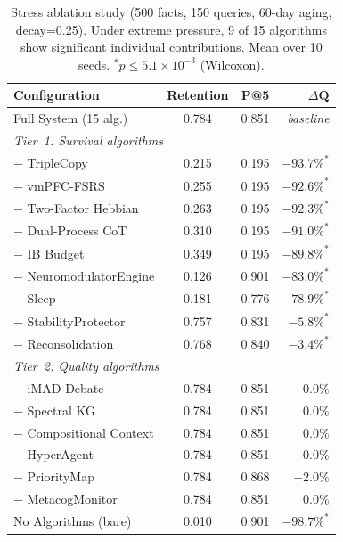 \documentclass{article}
\begin{document}
\begin{table}[h]
    \caption{Stress ablation study (500 facts, 150 queries,
    60-day aging, decay=0.25). Under extreme pressure, 9 of 15
    algorithms show significant individual contributions.
    Mean over 10 seeds. $^\ast p \le 5.1\times 10^{-3}$ (Wilcoxon).}
    \label{tab:stress-ablation}
    \centering
    \small
    \begin{tabular}{lccr}
        \toprule
        Configuration & Retention & P@5 & $\Delta$Q \\
        \midrule
        Full System (15 alg.) & 0.784 & 0.851 & \emph{baseline} \\
        \midrule
        \multicolumn{4}{l}{\textit{Tier~1: Survival algorithms}} \\
        $-$ TripleCopy & 0.215 & 0.195 & $-93.7\%^\ast$ \\
        $-$ vmPFC-FSRS & 0.255 & 0.195 & $-92.6\%^\ast$ \\
        $-$ Two-Factor Hebbian & 0.263 & 0.195 & $-92.3\%^\ast$ \\
        $-$ Dual-Process CoT & 0.310 & 0.195 & $-91.0\%^\ast$ \\
        $-$ IB Budget & 0.349 & 0.195 & $-89.8\%^\ast$ \\
        $-$ NeuromodulatorEngine & 0.126 & 0.901 & $-83.0\%^\ast$ \\
        $-$ Sleep & 0.181 & 0.776 & $-78.9\%^\ast$ \\
        $-$ StabilityProtector & 0.757 & 0.831 & $-5.8\%^\ast$ \\
        $-$ Reconsolidation & 0.768 & 0.840 & $-3.4\%^\ast$ \\
        \midrule
        \multicolumn{4}{l}{\textit{Tier~2: Quality algorithms}} \\
        $-$ iMAD Debate & 0.784 & 0.851 & $0.0\%$ \\
        $-$ Spectral KG & 0.784 & 0.851 & $0.0\%$ \\
        $-$ Compositional Context & 0.784 & 0.851 & $0.0\%$ \\
        $-$ HyperAgent & 0.784 & 0.851 & $0.0\%$ \\
        $-$ PriorityMap & 0.784 & 0.868 & $+2.0\%$ \\
        $-$ MetacogMonitor & 0.784 & 0.851 & $0.0\%$ \\
        \midrule
        No Algorithms (bare) & 0.010 & 0.901 & $-98.7\%^\ast$ \\
        \bottomrule
    \end{tabular}
\end{table}
\end{document}
